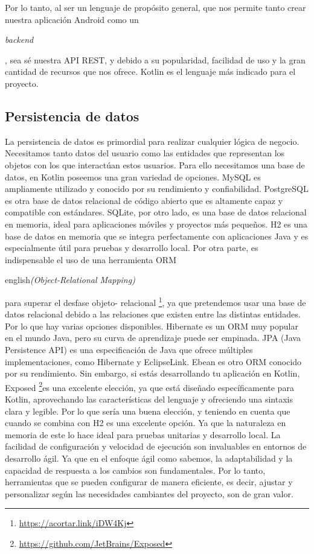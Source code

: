 Por lo tanto, al ser un lenguaje de propósito general, que nos permite tanto crear nuestra aplicación 
Android como un \begin{otherlanguage}{english}\textit{backend}\end{otherlanguage}, sea sé nuestra API 
REST, y debido a su popularidad, facilidad de uso y la gran cantidad de recursos que nos ofrece. Kotlin 
es el lenguaje más indicado para el proyecto.

\subsection{Persistencia de datos}

La persistencia de datos es primordial para realizar cualquier lógica de negocio. Necesitamos tanto 
datos del usuario como las entidades que representan los objetos con los que interactúan estos 
usuarios. Para ello necesitamos una base de datos, en Kotlin poseemos una gran variedad de opciones. 
MySQL es ampliamente utilizado y conocido por su rendimiento y confiabilidad. PostgreSQL es otra base 
de datos relacional de código abierto que es altamente capaz y compatible con estándares. SQLite, por 
otro lado, es una base de datos relacional en memoria, ideal para aplicaciones móviles y proyectos más 
pequeños. H2 es una base de datos en memoria que se integra perfectamente con aplicaciones Java y es 
especialmente útil para pruebas y desarrollo local. Por otra parte, es indispensable el uso de una 
herramienta ORM \begin{otherlanguage}
{english}\textit{(Object-Relational Mapping)}\end{otherlanguage} para superar el desfase objeto-
relacional \footnote{\url{https://acortar.link/iDW4Kj}}, ya que pretendemos usar una base de datos 
relacional debido a las relaciones que existen entre las distintas entidades. Por lo que hay varias 
opciones disponibles. Hibernate es un ORM muy popular en el mundo Java, pero su curva de aprendizaje 
puede ser empinada. JPA (Java Persistence API) es una especificación de Java que ofrece múltiples 
implementaciones, como Hibernate y EclipseLink. Ebean es otro ORM conocido por su rendimiento. Sin 
embargo, si estás desarrollando tu aplicación en Kotlin, Exposed 
\footnote{\url{https://github.com/JetBrains/Exposed}}es una excelente elección, ya que está diseñado 
específicamente para Kotlin, aprovechando las características del lenguaje y ofreciendo una sintaxis 
clara y legible. Por lo que sería una buena elección, y teniendo en cuenta que cuando se combina con  
H2 es una excelente opción. Ya que la naturaleza en memoria de este lo hace ideal para pruebas 
unitarias y desarrollo local. La facilidad de configuración y velocidad de ejecución son invaluables en 
entornos de desarrollo ágil. Ya que en el enfoque ágil como sabemos, la adaptabilidad y la capacidad de 
respuesta a los cambios son fundamentales. Por lo tanto, herramientas que se pueden configurar de 
manera eficiente, es decir, ajustar y personalizar según las necesidades cambiantes del proyecto, son 
de gran valor.

